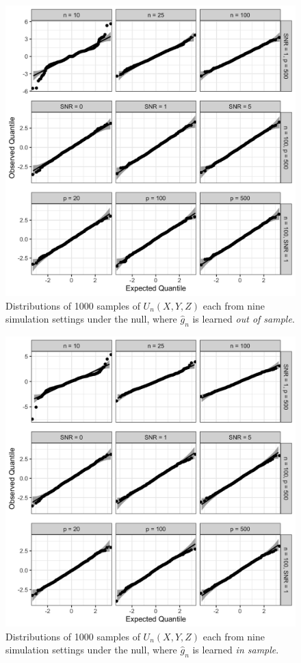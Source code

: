 \documentclass[ejs]{imsart}
\numberwithin{equation}{section}
\theoremstyle{plain}
\theoremstyle{definition}
\theoremstyle{remark}
\newcommand{\srx}{X}
\newcommand{\srz}{Z}
\newcommand{\sry}{Y}
\begin{document}
\clearpage

\begin{figure}[h!]
	\includegraphics[width = \textwidth]{out-of-sample.png}
	\caption{Distributions of 1000 samples of $U_n(\srx, \sry, \srz)$ each from nine simulation settings under the null, where $\widehat g_n$ is learned \textit{out of sample}.}
	\label{fig:out-of-sample}
\end{figure}

\clearpage

\begin{figure}[h!]
	\includegraphics[width = \textwidth]{in-sample.png}
	\caption{Distributions of 1000 samples of $U_n(\srx, \sry, \srz)$ each from nine simulation settings under the null, where $\widehat g_n$ is learned \textit{in sample}.}
	\label{fig:in-sample}
\end{figure}
\end{document}
